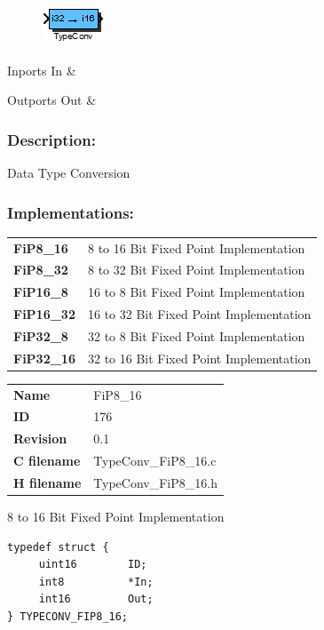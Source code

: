 \label{block:TypeConv}
\begin{figure}[H]\includegraphics{TypeConv}\end{figure} 

\begin{XtoCtabular}{Inports}
In & \tabularnewline
\hline
\end{XtoCtabular}


\begin{XtoCtabular}{Outports}
Out & \tabularnewline
\hline
\end{XtoCtabular}

\subsubsection*{Description:}
Data Type Conversion

\subsubsection*{Implementations:}
\begin{tabular}{l l}
\textbf{FiP8\_16} & 8 to 16 Bit Fixed Point Implementation\tabularnewline
\textbf{FiP8\_32} & 8 to 32 Bit Fixed Point Implementation\tabularnewline
\textbf{FiP16\_8} & 16 to 8 Bit Fixed Point Implementation\tabularnewline
\textbf{FiP16\_32} & 16 to 32 Bit Fixed Point Implementation\tabularnewline
\textbf{FiP32\_8} & 32 to 8 Bit Fixed Point Implementation\tabularnewline
\textbf{FiP32\_16} & 32 to 16 Bit Fixed Point Implementation\tabularnewline
\end{tabular}

\nopagebreak[0]
\begin{tabular}{l l}
\textbf{Name} & FiP8\_16 \tabularnewline
\textbf{ID} & 176 \tabularnewline
\textbf{Revision} & 0.1 \tabularnewline
\textbf{C filename} & TypeConv\_FiP8\_16.c \tabularnewline
\textbf{H filename} & TypeConv\_FiP8\_16.h \tabularnewline
\end{tabular}
\vspace{1ex}

8 to 16 Bit Fixed Point Implementation

\begin{lstlisting}
typedef struct {
     uint16        ID;
     int8          *In;
     int16         Out;
} TYPECONV_FIP8_16;
\end{lstlisting}

